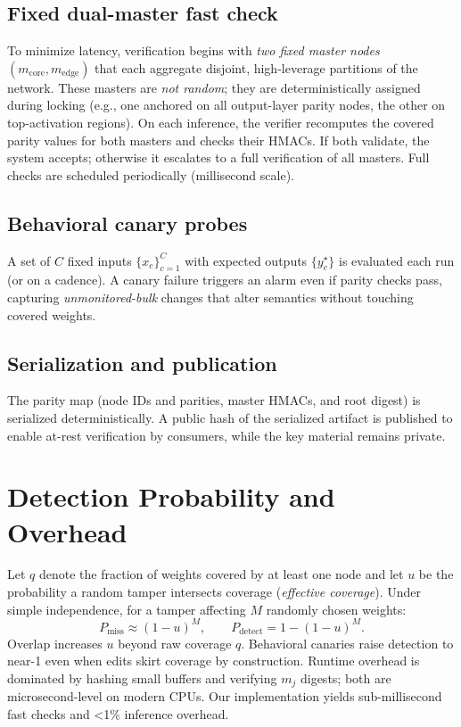\documentclass[11pt]{article}
\begin{document}
\subsection{Fixed dual-master fast check}
To minimize latency, verification begins with \emph{two fixed master nodes} $(m_{\mathrm{core}}, m_{\mathrm{edge}})$ that each aggregate disjoint, high-leverage partitions of the network. These masters are \emph{not random}; they are deterministically assigned during locking (e.g., one anchored on all output-layer parity nodes, the other on top-activation regions). On each inference, the verifier recomputes the covered parity values for both masters and checks their HMACs. If both validate, the system accepts; otherwise it escalates to a full verification of all masters. Full checks are scheduled periodically (millisecond scale).

\subsection{Behavioral canary probes}
A set of $C$ fixed inputs $\{x_c\}_{c=1}^C$ with expected outputs $\{y_c^\star\}$ is evaluated each run (or on a cadence). A canary failure triggers an alarm even if parity checks pass, capturing \emph{unmonitored-bulk} changes that alter semantics without touching covered weights.

\subsection{Serialization and publication}
The parity map (node IDs and parities, master HMACs, and root digest) is serialized deterministically. A public hash of the serialized artifact is published to enable at-rest verification by consumers, while the key material remains private.

\section{Detection Probability and Overhead}
Let $q$ denote the fraction of weights covered by at least one node and let $u$ be the probability a random tamper intersects coverage (\emph{effective coverage}). Under simple independence, for a tamper affecting $M$ randomly chosen weights:
\begin{equation}
  P_{\mathrm{miss}} \approx (1-u)^{M}, \qquad P_{\mathrm{detect}} = 1 - (1-u)^{M}. \label{eq:detect-prob}
\end{equation}
Overlap increases $u$ beyond raw coverage $q$. Behavioral canaries raise detection to near-1 even when edits skirt coverage by construction. Runtime overhead is dominated by hashing small buffers and verifying $m_j$ digests; both are microsecond-level on modern CPUs. Our implementation yields sub-millisecond fast checks and \textless1\% inference overhead.
\end{document}
